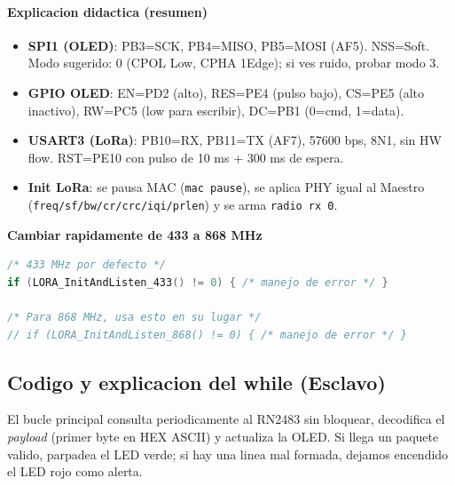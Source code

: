 \documentclass[a4paper,12pt]{article}
\begin{document}
\paragraph{Explicacion didactica (resumen)}
\begin{itemize}
  \item \textbf{SPI1 (OLED)}: PB3=SCK, PB4=MISO, PB5=MOSI (AF5). NSS=Soft. Modo sugerido: 0 (CPOL Low, CPHA 1Edge); si ves ruido, probar modo 3.
  \item \textbf{GPIO OLED}: EN=PD2 (alto), RES=PE4 (pulso bajo), CS=PE5 (alto inactivo), RW=PC5 (low para escribir), DC=PB1 (0=cmd, 1=data).
  \item \textbf{USART3 (LoRa)}: PB10=RX, PB11=TX (AF7), 57600 bps, 8N1, sin HW flow. RST=PE10 con pulso de 10 ms + 300 ms de espera.
  \item \textbf{Init LoRa}: se pausa MAC (\texttt{mac pause}), se aplica PHY igual al Maestro (\texttt{freq/sf/bw/cr/crc/iqi/prlen}) y se arma \texttt{radio rx 0}.
\end{itemize}

\textbf{Cambiar rapidamente de 433 a 868 MHz}
\begin{lstlisting}[language=C]
/* 433 MHz por defecto */
if (LORA_InitAndListen_433() != 0) { /* manejo de error */ }

/* Para 868 MHz, usa esto en su lugar */
// if (LORA_InitAndListen_868() != 0) { /* manejo de error */ }
\end{lstlisting}

\subsection{Codigo y explicacion del while (Esclavo)}

El bucle principal consulta periodicamente al RN2483 sin bloquear, decodifica el \textit{payload} (primer byte en HEX ASCII) y actualiza la OLED. 
Si llega un paquete valido, parpadea el LED verde; si hay una linea mal formada, dejamos encendido el LED rojo como alerta.
\end{document}
